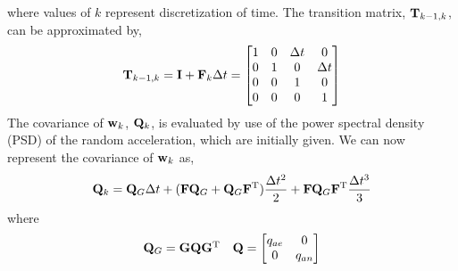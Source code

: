 where values of $k$ represent discretization of time. The transition matrix, $\mathbf{T}_{k-1,k}$, can be approximated by,
\begin{equation}
	\mathbf{T}_{k-1,k} = \mathbf{I} + \mathbf{F}_{k} \Delta t = \left[
			\begin{matrix}
				1 & 0 & \Delta t & 0 \\
				0 & 1 & 0           & \Delta t \\
				0 & 0 & 1           & 0 \\
				0 & 0 & 0           & 1 \\
			\end{matrix}
			\right]
	\label{eq:transitionMatrix}
\end{equation} %
The covariance of $\mathbf{w}_k$, $\mathbf{Q}_k$, is evaluated by use of the power spectral density (PSD) of the random acceleration, which are initially given. We can now represent the covariance of $\mathbf{w}_k$ as,
\begin{equation}
	\mathbf{Q}_k = \mathbf{Q}_{G} \Delta t + (\mathbf{F} \mathbf{Q}_{G} + \mathbf{Q}_{G} \mathbf{F}^{\mathrm{T}})\frac{\Delta t^2}{2}
	+ \mathbf{F} \mathbf{Q}_{G} \mathbf{F}^{\mathrm{T}} \frac{\Delta t^{3}}{3}
	\label{eq:eq12}
\end{equation} %
where
\begin{equation}
	\begin{array}{cc}
		\mathbf{Q}_{G} = \mathbf{G}\mathbf{Q}\mathbf{G}^{\mathrm{T}} & \mathbf{Q} = \left[
		\begin{matrix}
		q_{ae} 	& 0 		\\
		0		& q_{an} 	\\
		\end{matrix}
		\right]
	\end{array}
	\label{eq:eq11}
\end{equation} %


